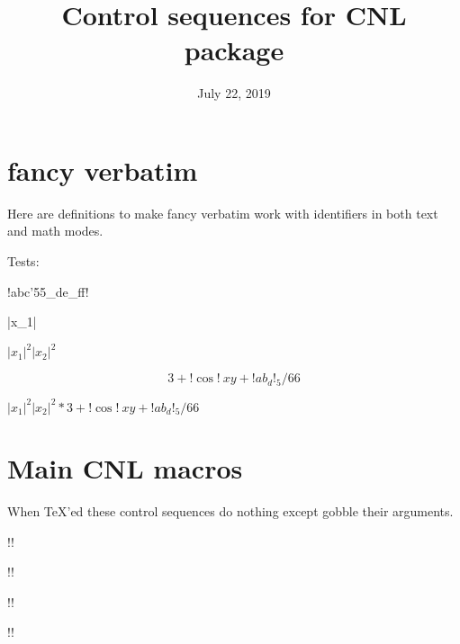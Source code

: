 \documentclass[12pt]{amsart}
\title{Control sequences for CNL package}
\date{July 22, 2019}
\author{}
\begin{document}
\maketitle

\section{fancy verbatim}

Here are definitions to make fancy verbatim work with
identifiers in both text and math modes.



\DefineShortVerb[formatcom=\color{red},fontfamily=mathtt]{\!}

\DefineShortVerb[formatcom=\color{blue},fontfamily=mathtt]{\|}

Tests:


!abc'55_de_ff!

|x_1|

$|x_1|^2 |x_2|^2$


\[
3 + !\cos!\ x y + !ab_d!_5/66
\]


$|x_1|^2 |x_2|^2 * 3 + !\cos!\ x y + !ab_d!_5/66$

\section{Main CNL macros}

When \TeX'ed these control sequences 
do nothing except gobble their arguments.

!\CNLexpand[k]\cs!

!\CNLnoexpand[k]\cs!

!\CNLdelete[k]\cs!

!\CNLcustom[k]!

\def\ignoreOptionAndCS[#1]#2{}

\def\onearg#1{(onearg:#1)} %


\def\ignoreOne#1{}



\def\ignoreOptionOrCS{%
\futurelet\nextToken\chooseBranch}


\def\chooseBranch{%
\let\next=\relax
\ifx\nextToken [%
 \let\next=\ignoreOptionAndCS%
\else%
 \let\next=\ignoreOne%
\fi%
\next%
}

\def\ignoreOptionAndCSS[#1]#2#3{}
\def\ignoreTwo#1#2{}
\def\ignoreOptionOrCSS{%
\futurelet\nextToken\chooseBranchTwo%
}
\def\chooseBranchTwo{%
\let\next=\relax
\ifx\nextToken [%
 \let\next=\ignoreOptionAndCSS%
\else%
 \let\next=\ignoreTwo%
\fi%
\next%
}
\end{document}
